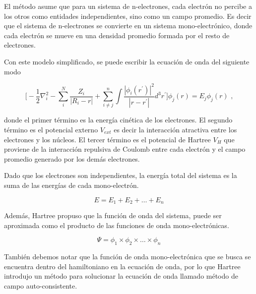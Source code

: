 El m\'etodo asume que para un sistema de n-electrones, cada electr\'on no 
percibe a los otros como entidades independientes, sino como un campo promedio. 
Es decir que el sistema de n-electrones se convierte en un sistema 
mono-electr\'onico, donde cada electr\'on se mueve en una densidad promedio 
formada por el resto de electrones.

Con este modelo simplificado, se puede escribir la ecuaci\'on de onda del 
siguiente modo


\begin{equation}
\big [ - \frac{1}{2} \nabla _{i}^{2} - \sum _{i} ^{N} 
\frac{Z_{i}}{|R_{i}-r|} + \sum _{i \ne j} ^{n} \int \frac{|\phi 
    _{i}(r^{\prime})|^{2}}{|r-r^{\prime }|}d^{3}r^{\prime} \big] \phi _{j} (r) 
= E_{j} \phi _{j} (r) \textrm{ ,}
\end{equation}

\noindent donde el primer t\'ermino es la energ\'ia cin\'etica de los 
electrones. El 
segundo t\'ermino es el potencial externo $V_{ext}$ es decir la interacci\'on 
atractiva entre los electrones y los n\'ucleos. El tercer t\'ermino es el 
potencial de Hartree $V_{H}$ que proviene de la interacci\'on repulsiva de 
Coulomb entre cada electr\'on y el campo promedio generado por los dem\'as 
electrones.


\noindent Dado que los electrones son independientes, la energ\'ia total del 
sistema es 
la suma de las energ\'ias de cada mono-electr\'on.

\begin{equation}
    E = E_{1} + E_{2} + \dots + E_{n}
\end{equation}

\noindent Adem\'as, Hartree propuso que la funci\'on de onda del sistema, puede 
ser 
aproximada como el producto de las funciones de onda mono-electr\'onicas.

\begin{equation}
    \Psi = \phi_{1} \times \phi_{2} \times \dots \times \phi_{n}
\end{equation}

\noindent Tambi\'en debemos notar que la funci\'on de onda mono-electr\'onica 
que se 
busca se encuentra dentro del hamiltoniano en  la ecuaci\'on de onda, por lo 
que Hartree introdujo un m\'etodo para solucionar la ecuaci\'on de onda llamado 
m\'etodo de campo auto-consistente.

